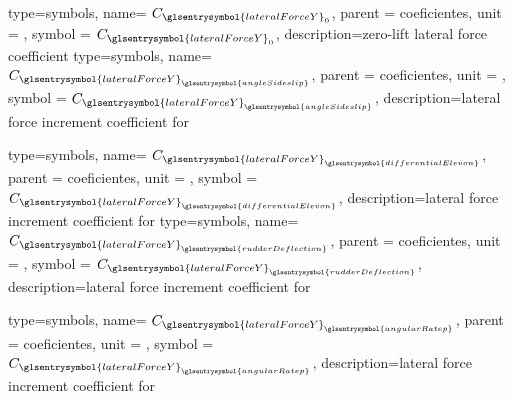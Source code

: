 {type=symbols,
    name= \ensuremath{C_{\glsentrysymbol{lateralForceY}_{0}}},
    parent = {coeficientes},
    unit = \unexpanded{},
    symbol = \ensuremath{C_{\glsentrysymbol{lateralForceY}_{0}}},
    description={zero-lift lateral force coefficient}
}
{type=symbols,
    name= \ensuremath{C_{{\glsentrysymbol{lateralForceY}}_{\glsentrysymbol{angleSideslip}}}},
    parent = {coeficientes},
    unit = \unexpanded{},
    symbol = \ensuremath{C_{{\glsentrysymbol{lateralForceY}}_{\glsentrysymbol{angleSideslip}}}},
    description={lateral force increment coefficient for }
}

{type=symbols,
    name= \ensuremath{C_{{\glsentrysymbol{lateralForceY}}_{\glsentrysymbol{differentialElevon}}}},
    parent = {coeficientes},
    unit = \unexpanded{},
    symbol = \ensuremath{C_{{\glsentrysymbol{lateralForceY}}_{\glsentrysymbol{differentialElevon}}}},
    description={lateral force increment coefficient for }
}
{type=symbols,
    name= \ensuremath{C_{{\glsentrysymbol{lateralForceY}}_{\glsentrysymbol{rudderDeflection}}}},
    parent = {coeficientes},
    unit = \unexpanded{},
    symbol = \ensuremath{C_{{\glsentrysymbol{lateralForceY}}_{\glsentrysymbol{rudderDeflection}}}},
    description={lateral force increment coefficient for }
}

{type=symbols,
    name= \ensuremath{C_{{\glsentrysymbol{lateralForceY}}_{\glsentrysymbol{angularRatep}}}},
    parent = {coeficientes},
    unit = \unexpanded{},
    symbol = \ensuremath{C_{{\glsentrysymbol{lateralForceY}}_{\glsentrysymbol{angularRatep}}}},
    description={lateral force increment coefficient for }
}